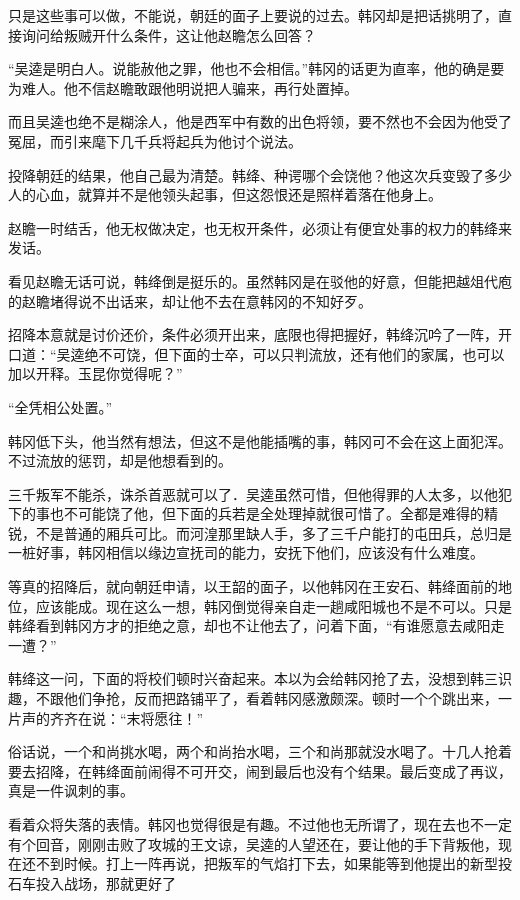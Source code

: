 只是这些事可以做，不能说，朝廷的面子上要说的过去。韩冈却是把话挑明了，直接询问给叛贼开什么条件，这让他赵瞻怎么回答？

“吴逵是明白人。说能赦他之罪，他也不会相信。”韩冈的话更为直率，他的确是要为难人。他不信赵瞻敢跟他明说把人骗来，再行处置掉。

而且吴逵也绝不是糊涂人，他是西军中有数的出色将领，要不然也不会因为他受了冤屈，而引来麾下几千兵将起兵为他讨个说法。

投降朝廷的结果，他自己最为清楚。韩绛、种谔哪个会饶他？他这次兵变毁了多少人的心血，就算并不是他领头起事，但这怨恨还是照样着落在他身上。

赵瞻一时结舌，他无权做决定，也无权开条件，必须让有便宜处事的权力的韩绛来发话。

看见赵瞻无话可说，韩绛倒是挺乐的。虽然韩冈是在驳他的好意，但能把越俎代庖的赵瞻堵得说不出话来，却让他不去在意韩冈的不知好歹。

招降本意就是讨价还价，条件必须开出来，底限也得把握好，韩绛沉吟了一阵，开口道：“吴逵绝不可饶，但下面的士卒，可以只判流放，还有他们的家属，也可以加以开释。玉昆你觉得呢？”

“全凭相公处置。”

韩冈低下头，他当然有想法，但这不是他能插嘴的事，韩冈可不会在这上面犯浑。不过流放的惩罚，却是他想看到的。

三千叛军不能杀，诛杀首恶就可以了．吴逵虽然可惜，但他得罪的人太多，以他犯下的事也不可能饶了他，但下面的兵若是全处理掉就很可惜了。全都是难得的精锐，不是普通的厢兵可比。而河湟那里缺人手，多了三千户能打的屯田兵，总归是一桩好事，韩冈相信以缘边宣抚司的能力，安抚下他们，应该没有什么难度。

等真的招降后，就向朝廷申请，以王韶的面子，以他韩冈在王安石、韩绛面前的地位，应该能成。现在这么一想，韩冈倒觉得亲自走一趟咸阳城也不是不可以。只是韩绛看到韩冈方才的拒绝之意，却也不让他去了，问着下面，“有谁愿意去咸阳走一遭？”

韩绛这一问，下面的将校们顿时兴奋起来。本以为会给韩冈抢了去，没想到韩三识趣，不跟他们争抢，反而把路铺平了，看着韩冈感激颇深。顿时一个个跳出来，一片声的齐齐在说：“末将愿往！”

俗话说，一个和尚挑水喝，两个和尚抬水喝，三个和尚那就没水喝了。十几人抢着要去招降，在韩绛面前闹得不可开交，闹到最后也没有个结果。最后变成了再议，真是一件讽刺的事。

看着众将失落的表情。韩冈也觉得很是有趣。不过他也无所谓了，现在去也不一定有个回音，刚刚击败了攻城的王文谅，吴逵的人望还在，要让他的手下背叛他，现在还不到时候。打上一阵再说，把叛军的气焰打下去，如果能等到他提出的新型投石车投入战场，那就更好了

